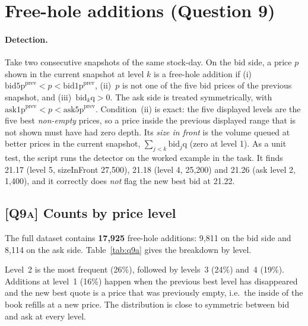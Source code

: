 \documentclass[11pt,a4paper]{article}
\newcommand{\Q}[1]{\textsc{[Q#1]}}
\begin{document}
\section{Free-hole additions (Question 9)}\label{sec:freehole}

\paragraph{Detection.} Take two consecutive snapshots of the same stock-day. On the bid side, a
price $p$ shown in the current snapshot at level $k$ is a free-hole addition if
(i)~$\text{bid5p}^{\text{prev}}<p<\text{bid1p}^{\text{prev}}$,
(ii)~$p$ is not one of the five bid prices of the previous snapshot, and
(iii)~$\text{bid}_k\text{q}>0$. The ask side is treated symmetrically, with
$\text{ask1p}^{\text{prev}}<p<\text{ask5p}^{\text{prev}}$. Condition~(ii) is exact: the five
displayed levels are the five best \emph{non-empty} prices, so a price inside the previous
displayed range that is not shown must have had zero depth. Its \emph{size in front} is the volume
queued at better prices in the current snapshot, $\sum_{j<k}\text{bid}_j\text{q}$ (zero at level 1).
As a unit test, the script runs the detector on the worked example in the task. It finds 21.17
(level 5, sizeInFront 27{,}500), 21.18 (level 4, 25{,}200) and 21.26 (ask level 2, 1{,}400), and it
correctly does \emph{not} flag the new best bid at 21.22.

\subsection*{\Q{9a} Counts by price level}

The full dataset contains \textbf{17{,}925} free-hole additions: 9{,}811 on the bid side and
8{,}114 on the ask side. Table~\ref{tab:q9a} gives the breakdown by level.

\begin{table}[H]
\centering\small
\caption{\Q{9a} Number of free-hole additions by price level (level in the \emph{current}
snapshot).}
\label{tab:q9a}

\end{table}

Level~2 is the most frequent (26\%), followed by levels~3 (24\%) and~4 (19\%). Additions at
level~1 (16\%) happen when the previous best level has disappeared and the new best quote is a
price that was previously empty, i.e.\ the inside of the book refills at a new price. The
distribution is close to symmetric between bid and ask at every level.
\end{document}
